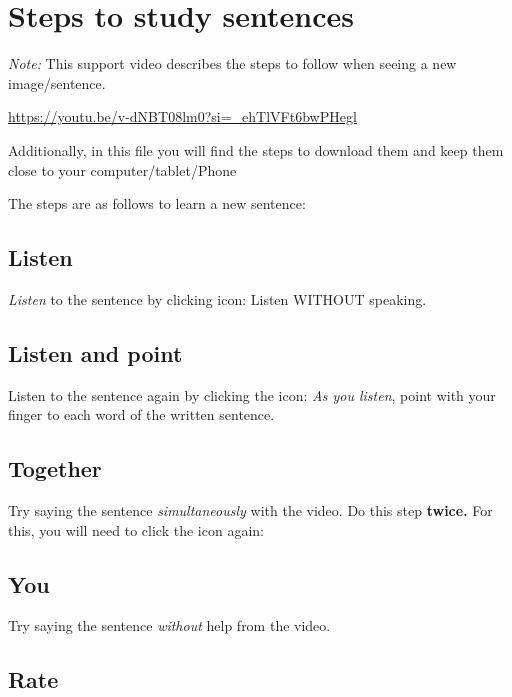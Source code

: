 \documentclass[
]{book}
\begin{document}
\hypertarget{cross_5}{%
\chapter{Steps to study sentences}\label{cross_5}}

\emph{Note:} This support video describes the steps to follow when seeing a new image/sentence.

\url{https://youtu.be/v-dNBT08lm0?si=_ehTlVFt6bwPHegl}

Additionally, in this file you will find the steps to download them and keep them close to your computer/tablet/Phone

The steps are as follows to learn a new sentence:

\hypertarget{cross_6}{%
\section{Listen}\label{cross_6}}

\emph{Listen} to the sentence by clicking icon: Listen WITHOUT speaking.

\hypertarget{listen-and-point}{%
\section{Listen and point}\label{listen-and-point}}

Listen to the sentence again by clicking the icon: \emph{As you listen}, point with your finger to each word of the written sentence.

\hypertarget{together}{%
\section{Together}\label{together}}

Try saying the sentence \emph{simultaneously } with the video. Do this step \textbf{twice.} For this, you will need to click the icon again:

\hypertarget{you}{%
\section{You}\label{you}}

Try saying the sentence \emph{without} help from the video.

\hypertarget{rate}{%
\section{Rate}\label{rate}}
\end{document}
